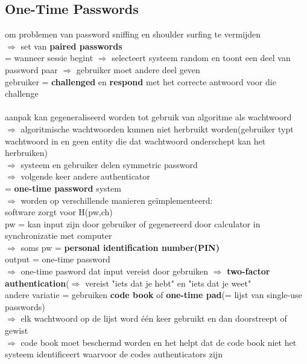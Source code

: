 \documentclass{report}
\begin{document}
\subsection{One-Time Passwords}
om problemen van password sniffing en shoulder surfing te vermijden 
\\$\Rightarrow$ set van  \textbf{paired passwords}
\\= wanneer sessie begint $\Rightarrow$ selecteert systeem random en toont een deel van password paar $\Rightarrow$ gebruiker moet andere deel geven
\\ gebruiker = \textbf{challenged} en \textbf{respond} met het correcte antwoord voor die challenge
\\
\\aanpak kan gegeneraliseerd worden tot gebruik van algoritme als wachtwoord
\\$\Rightarrow$ algoritmische wachtwoorden kunnen niet herbruikt worden(gebruiker typt wachtwoord in en geen entity die dat wachtwoord onderschept kan het herbruiken)
\\$\Rightarrow$ systeem en gebruiker delen symmetric password
\\$\Rightarrow$ volgende keer andere authenticator 
\\= \textbf{one-time password} system
\\$\Rightarrow$ worden op verschillende manieren ge\"implementeerd:
\\software zorgt voor H(pw,ch)
\\pw = kan input zijn door gebruiker of gegenereerd door calculator in synchronizatie met computer
\\$\Rightarrow$ soms pw = \textbf{personal identification number(PIN)}
\\output = one-time password
\\$\Rightarrow$ one-time pasword dat input vereist door gebruiken $\Rightarrow$ \textbf{two-factor authentication}($\Rightarrow$ vereist "iets dat je hebt" en "iets dat je weet"
\\ andere variatie = gebruiken \textbf{code book} of \textbf{one-time pad}(= lijst van single-use passwords)
\\$\Rightarrow$ elk wachtwoord op de lijst word \'e\'en keer gebruikt en dan doorstreept of gewist
\\$\Rightarrow$ code book moet beschermd worden en het helpt dat de code book niet het systeem identificeert waarvoor de codes authenticators zijn
\end{document}
